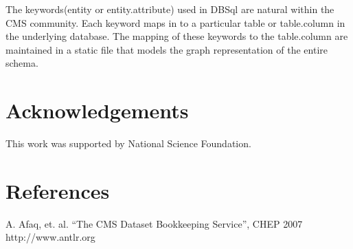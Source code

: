 \documentclass[a4paper]{jpconf}
\begin{document}
The keywords(entity or entity.attribute) used in DBSql 
are natural within the CMS community. Each keyword maps 
in to a particular 
table or table.column in the underlying database. 
The mapping of these keywords to the table.column are
maintained in a static file that models the graph
representation of the entire schema.

\section{Acknowledgements}

This work was supported by National Science Foundation.

\section*{References}
\begin{thebibliography}{9}
 A. Afaq, et. al. ``The CMS Dataset Bookkeeping Service'', CHEP 2007 
 http://www.antlr.org

\end{thebibliography}
\end{document}
